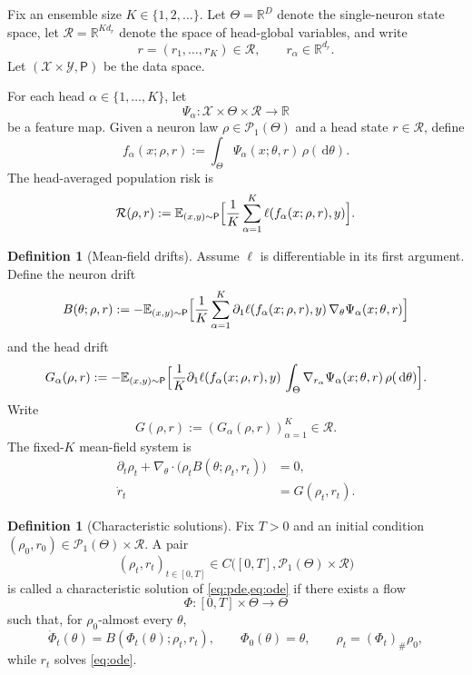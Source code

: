 \documentclass[11pt]{article}
\theoremstyle{definition}
\newtheorem{definition}[theorem]{Definition}
\newcommand{\R}{\mathbb{R}}
\newcommand{\E}{\mathbb{E}}
\newcommand{\PP}{\mathcal{P}}
\newcommand{\dd}{\,\mathrm{d}}
\begin{document}
Fix an ensemble size $K\in\{1,2,\dots\}$. Let $\Theta=\R^D$ denote the single-neuron state space, let $\mathcal R=\R^{K d_r}$ denote the space of head-global variables, and write
\[
  r=(r_1,\dots,r_K)\in \mathcal R,
  \qquad
  r_\alpha\in \R^{d_r}.
\]
Let $(\mathcal X\times\mathcal Y,\mathsf P)$ be the data space.

For each head $\alpha\in\{1,\dots,K\}$, let
\[
  \Psi_\alpha:\mathcal X\times\Theta\times\mathcal R\to\R
\]
be a feature map. Given a neuron law $\rho\in\PP_1(\Theta)$ and a head state $r\in\mathcal R$, define
\begin{equation}
  f_\alpha(x;\rho,r)
  :=
  \int_\Theta \Psi_\alpha(x;\theta,r)\,\rho(\dd\theta).
  \label{eq:output}
\end{equation}
The head-averaged population risk is
\begin{equation}
  \mathcal R(\rho,r)
  :=
  \E_{(x,y)\sim\mathsf P}
  \Bigl[
    \frac1K\sum_{\alpha=1}^K \ell(f_\alpha(x;\rho,r),y)
  \Bigr].
  \label{eq:risk}
\end{equation}

\begin{definition}[Mean-field drifts]
Assume $\ell$ is differentiable in its first argument. Define the neuron drift
\begin{equation}
  B(\theta;\rho,r)
  :=
  -\E_{(x,y)\sim\mathsf P}
  \Bigl[
    \frac1K\sum_{\alpha=1}^K
    \partial_1\ell(f_\alpha(x;\rho,r),y)\,
    \nabla_\theta \Psi_\alpha(x;\theta,r)
  \Bigr]
  \label{eq:drift-B}
\end{equation}
and the head drift
\begin{equation}
  G_\alpha(\rho,r)
  :=
  -\E_{(x,y)\sim\mathsf P}
  \Bigl[
    \frac1K
    \partial_1\ell(f_\alpha(x;\rho,r),y)\,
    \int_\Theta \nabla_{r_\alpha}\Psi_\alpha(x;\theta,r)\,\rho(\dd\theta)
  \Bigr].
  \label{eq:drift-G}
\end{equation}
Write
\[
  G(\rho,r):=(G_\alpha(\rho,r))_{\alpha=1}^K\in\mathcal R.
\]
The fixed-$K$ mean-field system is
\begin{align}
  \partial_t \rho_t
  +
  \nabla_\theta\cdot\bigl(\rho_t B(\theta;\rho_t,r_t)\bigr)
  &=0,
  \label{eq:pde}
  \\
  \dot r_t &= G(\rho_t,r_t).
  \label{eq:ode}
\end{align}
\end{definition}

\begin{definition}[Characteristic solutions]
Fix $T>0$ and an initial condition $(\rho_0,r_0)\in\PP_1(\Theta)\times\mathcal R$. A pair
\[
  (\rho_t,r_t)_{t\in[0,T]}
  \in
  C\bigl([0,T],\PP_1(\Theta)\times\mathcal R\bigr)
\]
is called a characteristic solution of \cref{eq:pde,eq:ode} if there exists a flow
\[
  \Phi:[0,T]\times\Theta\to\Theta
\]
such that, for $\rho_0$-almost every $\theta$,
\[
  \dot\Phi_t(\theta)=B(\Phi_t(\theta);\rho_t,r_t),
  \qquad
  \Phi_0(\theta)=\theta,
  \qquad
  \rho_t=(\Phi_t)_\#\rho_0,
\]
while $r_t$ solves \cref{eq:ode}.
\end{definition}
\end{document}
